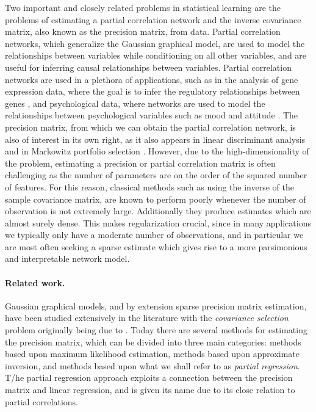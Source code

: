 \documentclass{article}
\begin{document}
Two important and closely related problems in statistical learning are the
problems of estimating a partial correlation network and the inverse covariance
matrix, also known as the precision matrix, from data. Partial correlation
networks, which generalize the Gaussian graphical model, are used to model the
relationships between variables while conditioning on all other variables, and
are useful for inferring causal relationships between variables. Partial
correlation networks are used in a plethora of applications, such as in the
analysis of gene expression data, where the goal is to infer the regulatory
relationships between genes \citep{delaFuente04}, and psychological data, where
networks are used to model the relationships between psychological variables
such as mood and attitude \citep{Epskamp18}. The precision matrix, from which
we can obtain the partial correlation network, is also of interest in its own
right, as it also appears in linear discriminant analysis \citep{Hastie09} and
in Markowitz portfolio selection \citep{Markowitz52}. However, due to the
high-dimensionality of the problem, estimating a precision or partial
correlation matrix is often challenging as the number of parameters are on the
order of the squared number of features. For this reason, classical methods
such as using the inverse of the sample covariance matrix, are known to perform
poorly whenever the number of observation is not extremely large. Additionally
they produce estimates which are almost surely dense. This makes regularization
crucial, since in many applications we typically only have a moderate number of
observations, and in particular we are most often seeking a sparse estimate
which gives rise to a more parsimonious and interpretable network model.

\paragraph{Related work.} Gaussian graphical models, and by extension sparse
precision matrix estimation, have been studied extensively in the literature
with the \emph{covariance selection} problem originally being due to
\cite{Dempster72}. Today there are several methods for estimating the precision
matrix, which can be divided into three main categories: methods based upon
maximum likelihood estimation, methods based upon approximate inversion, and
methods based upon what we shall refer to as \emph{partial regression}. T/he
partial regression approach exploits a connection between the precision matrix
and linear regression, and is given its name due to its close relation to
partial correlations.
\end{document}

